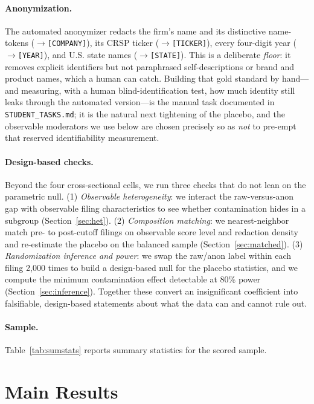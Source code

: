 \documentclass[12pt]{article}
\begin{document}
\paragraph{Anonymization.} The automated anonymizer redacts the firm's name and its
distinctive name-tokens ($\rightarrow$\texttt{[COMPANY]}), its CRSP ticker
($\rightarrow$\texttt{[TICKER]}), every four-digit year ($\rightarrow$\texttt{[YEAR]}), and
U.S. state names ($\rightarrow$\texttt{[STATE]}). This is a deliberate \emph{floor}: it
removes explicit identifiers but not paraphrased self-descriptions or brand and product
names, which a human can catch. Building that gold standard by hand---and measuring, with a
human blind-identification test, how much identity still leaks through the automated
version---is the manual task documented in \texttt{STUDENT\_TASKS.md}; it is the natural next
tightening of the placebo, and the observable moderators we use below are chosen precisely so
as \emph{not} to pre-empt that reserved identifiability measurement.

\paragraph{Design-based checks.} Beyond the four cross-sectional cells, we run three checks
that do not lean on the parametric null. (1) \emph{Observable heterogeneity}: we interact the
raw-versus-anon gap with observable filing characteristics to see whether contamination hides
in a subgroup (Section~\ref{sec:het}). (2) \emph{Composition matching}: we nearest-neighbor
match pre- to post-cutoff filings on observable score level and redaction density and
re-estimate the placebo on the balanced sample (Section~\ref{sec:matched}). (3)
\emph{Randomization inference and power}: we swap the raw/anon label within each filing
2{,}000 times to build a design-based null for the placebo statistics, and we compute the
minimum contamination effect detectable at 80\% power (Section~\ref{sec:inference}). Together
these convert an insignificant coefficient into falsifiable, design-based statements about
what the data can and cannot rule out.

\paragraph{Sample.} Table~\ref{tab:sumstats} reports summary statistics for the scored
sample.

\section{Main Results}\label{sec:res}
\end{document}
